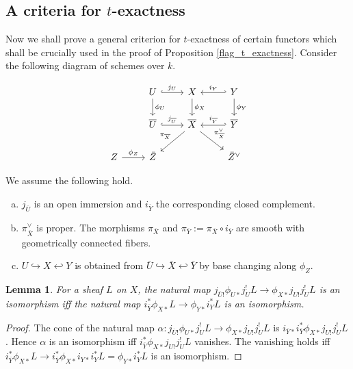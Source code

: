 \documentclass[12pt, reqno]{amsart}
\theoremstyle{plain}
\newtheorem{lem}[thm]{\bf Lemma}
\theoremstyle{definition}
\theoremstyle{definition}
\begin{document}
\subsection{A criteria for $t$-exactness}\label{vanishing_lemma}

 Now we shall prove a general criterion for $t$-exactness of certain functors which shall be crucially used in the proof of Proposition \ref{flag_t_exactness}. Consider the following diagram of schemes over $k$.

\begin{equation}\label{vanishing_diagram}
  \begin{tikzcd}[row sep=normal, column sep=normal]
      & U \arrow[r, hook, "j_{U}"] \arrow[d, "\phi_U"] & X \arrow[d, "\phi_X"] & Y \arrow[l, hook', "i_{Y}"'] \arrow[d,"\phi_Y"]\\
      & \overline{U} \arrow[r, hook, "j_{\overline{U}}"] & \overline{X} \arrow[dr,"\pi_{\overline{X}}^{\vee}"] \arrow[dl,"\pi_{\overline{X}}"'] & \overline{Y} \arrow[l, hook', "i_{\overline{Y}}"'] \\
      Z \arrow[r,"\phi_Z"] & \bar{Z} & & \bar{Z}^{\vee} 
  \end{tikzcd}
\end{equation}

We assume the following hold.

\begin{enumerate}[(a)]
     \item $j_{\overline{U}}$ is an open immersion and $i_{\overline{Y}}$ the corresponding closed complement.
     \item $\pi_{\overline{X}}^{\vee}$ is proper. The morphisms $\pi_{\overline{X}}$ and $\pi_{\overline{Y}}:=\pi_{\overline{X}} \circ i_{\overline{Y}}$ are smooth with geometrically connected fibers.
     \item $U \hookrightarrow X \hookleftarrow Y$ is obtained from $\bar{U} \hookrightarrow \bar{X} \hookleftarrow \bar{Y}$ by base changing along $\phi_Z$.
\end{enumerate}



\begin{lem}\label{vanishing_lemma_sta}
    For a sheaf $L$ on $X$, the natural map $j_{\overline{U}!}\phi_{U*}j_{U}^{!}L \to \phi_{X*}j_{U!}j_{U}^{!}L$ is an isomorphism iff the natural map $i_{\overline{Y}}^*\phi_{X*}L \to \phi_{Y*}i^{*}_{Y}L$ is an isomorphism.
\end{lem}

\begin{proof}
    The cone of the natural map $\alpha \colon j_{\overline{U}!}\phi_{U*}j_{U}^{!}L \to \phi_{X*}j_{U!}j_{U}^{!}L$ is $i_{\overline{Y}*}i_{\overline{Y}}^*\phi_{X*}j_{U!}j_{U}^{!}L$. Hence $\alpha$ is an isomorphism iff $i_{\overline{Y}}^*\phi_{X*}j_{U!}j_{U}^{!}L$ vanishes. The vanishing holds iff $i_{\overline{Y}}^*\phi_{X*}L \to i_{\overline{Y}}^*\phi_{X*}i_{Y*}i^{*}_{Y}L=\phi_{Y*}i^{*}_{Y}L$ is an isomorphism. 
\end{proof}
\end{document}
